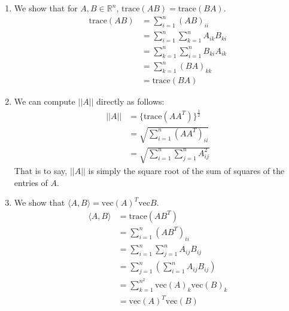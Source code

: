 \documentclass[12pt]{exam}
\newcommand{\Q}[1]{\question{\large{\textbf{#1}}}}
\begin{document}
\begin{questions}
\newpage
\Q{Trace of a square matrix}
\begin{solution}
\begin{enumerate}[label=(\alph*)]
  \item We show that for $A,B \in \mathbb{R}^n$, $\text{trace}(AB) = \text{trace}(BA)$.
  \begin{align*}
    \text{trace}(AB) &= \sum_{i = 1}^n (AB)_{ii} \tag{Definition of trace} \\
    &= \sum_{i=1}^n \sum_{k=1}^n A_{ik}B_{ki} \tag{Definition of matrix multiplication} \\
    &= \sum_{k=1}^n \sum_{i=1}^n B_{ki}A_{ik} \tag{Swap summation indexes and use commutativity of scalar multiplication} \\
    &= \sum_{k=1}^n (BA)_{kk} \tag{Definition of matrix multiplication} \\
    &= \text{trace}(BA) \tag{Definition of trace}
  \end{align*}
  \item We can compute $||A||$ directly as follows:
  \begin{align*}
    ||A|| &= \{\text{trace}(AA^T)\}^{\frac{1}{2}} \\
    &= \sqrt{\sum_{i=1}^n (AA^T)_{ii}} \tag{Definition of trace} \\
    &= \sqrt{\sum_{i=1}^n \sum_{j=1}^n A_{ij}^2 } \tag{Definition of matrix multiplication}
  \end{align*}
  That is to say, $||A||$ is simply the square root of the sum of squares of the entries of $A$.
  \item We show that $\langle A, B \rangle = \text{vec}(A)^T \text{vec}{B}$. 
  \begin{align*}
    \langle A, B \rangle &= \text{trace}(AB^T) \tag{Given in part (b)} \\
    &= \sum_{i=1}^n (AB^T)_{ii} \tag{Definition of trace} \\
    &= \sum_{i=1}^n \sum_{j=1}^n A_{ij}B_{ij} \tag{Definition of matrix multiplication} \\
    &= \sum_{j=1}^n \left( \sum_{i=1}^n A_{ij}B_{ij} \right) \tag{Swap indeces to show that we're multiplying elements in corresponding columns and summing them} \\
    &= \sum_{k=1}^{n^2} \text{vec}(A)_k \text{vec}(B)_k \tag{Re-indexing and using definition of vec($\cdot$)} \\
    &= \text{vec}(A)^T \text{vec}(B) \tag{Definition of dot product}
  \end{align*}


\end{enumerate}
\end{solution}
\end{questions}
\end{document}
